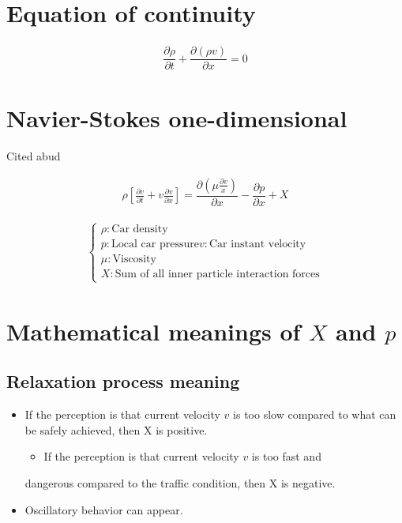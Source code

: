 \documentclass[11pt]{article}
\date{\today}
\title{}
\begin{document}
\tableofcontents



\section{Equation of continuity}
\label{sec:orga4c8059}
\begin{equation}
  \begin{aligned}
    \dfrac{\partial{\rho}}{\partial{t}} + \dfrac{\partial{\left( \rho{}v \right)}}{\partial{x}}=0
  \end{aligned}
\end{equation}

\section{Navier-Stokes one-dimensional}
\label{sec:orgcda6a20}
Cited \cite{schlichting2016boundary} abud \cite{Kerner_1993} 

\begin{equation}
\begin{aligned}
\label{eq:NS-n1}
\rho{}\left[\frac{\partial{v}}{\partial{t}} + v\frac{\partial{v}}{\partial{x}} \right] = \dfrac{\partial \left(\mu \frac{\partial{v}}{x} \right)}{\partial{x}} - \dfrac{\partial{p}}{\partial{x}} + X
\end{aligned}
\end{equation}

\begin{equation}
\begin{aligned}
\begin{cases}
\rho : \textrm{Car density}\\
p: \textrm{Local car pressure}
v{}: \textrm{Car instant velocity}\\
\mu{}: \textrm{Viscosity}\\
X: \textrm{Sum of all inner particle interaction forces}
\end{cases}
\end{aligned}
\end{equation}

\section{Mathematical meanings of \(X\) and \(p\)}
\label{sec:org87656dc}
\subsection{Relaxation process meaning}
\label{sec:org5c0294d}
\begin{itemize}
\item If the perception is that current velocity \(v\) is too slow compared
to what can be safely achieved, then X is positive.
\begin{itemize}
\item If the perception is that current velocity \(v\) is too fast and
\end{itemize}
dangerous compared to the traffic condition, then X is negative.
\item Oscillatory behavior can appear.
\end{itemize}
\end{document}
